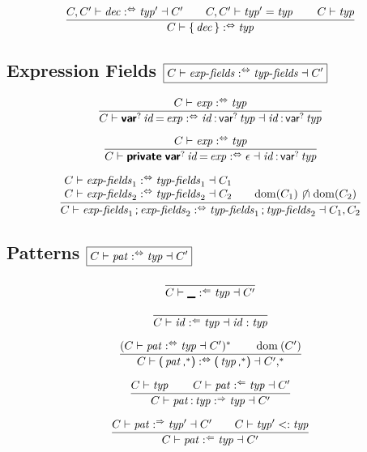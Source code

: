 $$
\frac{
  C, C' \vdash \x{dec} \analsynth \x{typ}' \dashv C'
  \qquad
  C, C' \vdash \x{typ}' = \x{typ}
  \qquad
  C \vdash \x{typ}
}{
  C \vdash \K\{ \x{dec} \K\} \analsynth \x{typ}
}
$$


\subsection*{Expression Fields \hfill $\boxed{C \vdash \x{exp-fields} \analsynth \x{typ-fields} \dashv C'}$}

$$
\frac{
  C \vdash \x{exp} \analsynth \x{typ}
}{
  C \vdash \KK{var}^? \x{id} \K= \x{exp} \analsynth \x{id} \K: \, \K{var}^? \x{typ} \dashv \x{id} \K: \, \K{var}^? \x{typ}
}
$$

$$
\frac{
  C \vdash \x{exp} \analsynth \x{typ}
}{
  C \vdash \KK{private} \; \KK{var}^? \x{id} \K= \x{exp} \analsynth \epsilon \dashv \x{id} \K: \, \K{var}^? \x{typ}
}
$$

$$
\frac{
  \begin{array}{@{}l@{\qquad}l@{}}
  C \vdash \x{exp-fields}_1 \analsynth \x{typ-fields}_1 \dashv C_1
  \\
  C \vdash \x{exp-fields}_2 \analsynth \x{typ-fields}_2 \dashv C_2
  &
  \Dom(C_1) \setdisj \Dom(C_2)
  \end{array}
}{
  C \vdash \x{exp-fields}_1 \K; \x{exp-fields}_2 \analsynth \x{typ-fields}_1 \K; \x{typ-fields}_2 \dashv C_1, C_2
}
$$


\subsection*{Patterns \hfill $\boxed{C \vdash \x{pat} \analsynth \x{typ} \dashv C'}$}

$$
\frac{
}{
  C \vdash \KK\textunderscore \anal \x{typ} \dashv C'
}
$$

$$
\frac{
}{
  C \vdash \x{id} \anal \x{typ} \dashv \x{id} : \x{typ}
}
$$

$$
\frac{
  (C \vdash \x{pat} \analsynth \x{typ} \dashv C')^\ast
  \qquad
  \Dom(C')
}{
  C \vdash \K( \x{pat}\K,^\ast \K) \analsynth \K( \x{typ}\K,^\ast \K) \dashv C',^\ast
}
$$

$$
\frac{
  C \vdash \x{typ}
  \qquad
  C \vdash \x{pat} \anal \x{typ} \dashv C'
}{
  C \vdash \x{pat} \K: \x{typ} \synth \x{typ} \dashv C'
}
$$

$$
\frac{
  C \vdash \x{pat} \synth \x{typ}' \dashv C'
  \qquad
  C \vdash \x{typ}' <: \x{typ}
}{
  C \vdash \x{pat} \anal \x{typ} \dashv C'
}
$$


